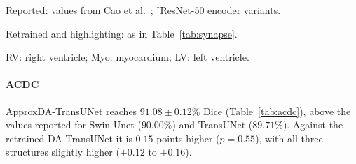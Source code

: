\begin{table}[t]
\centering
\caption{Results on ACDC cardiac MRI.}
\label{tab:acdc}
\begin{tablenotes}
\item Reported: values from Cao et al.~\cite{cao2022swinunet}; $^{\dagger}$ResNet-50 encoder variants.
\item Retrained and highlighting: as in Table~\ref{tab:synapse}.
\item RV: right ventricle; Myo: myocardium; LV: left ventricle.
\end{tablenotes}
\end{table}

\paragraph{ACDC} ApproxDA-TransUNet reaches $91.08 \pm 0.12\%$ Dice (Table~\ref{tab:acdc}), above the values reported for Swin-Unet ($90.00\%$) and TransUNet ($89.71\%$). Against the retrained DA-TransUNet it is $0.15$ points higher ($p = 0.55$), with all three structures slightly higher ($+0.12$ to $+0.16$).

